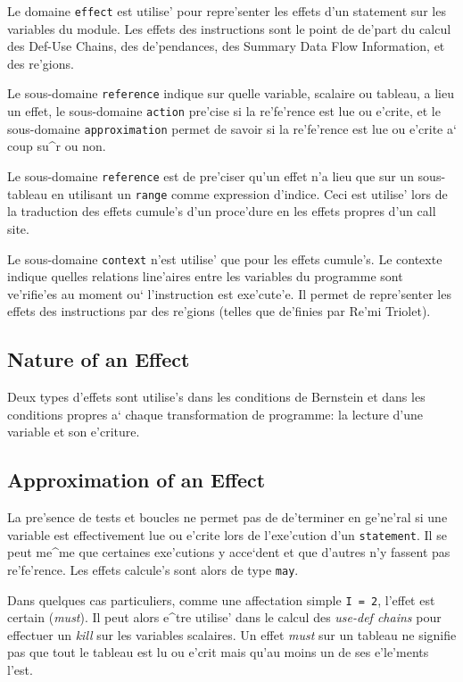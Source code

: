 {
Le domaine \verb/effect/ est utilise' pour repre'senter les effets d'un
statement sur les variables du module. Les effets des instructions sont
le point de de'part du calcul des Def-Use Chains, des de'pendances, des
Summary Data Flow Information, et des re'gions.

Le sous-domaine {\tt reference} indique sur quelle variable, scalaire ou
tableau, a lieu un effet, le sous-domaine {\tt action} pre'cise si la
re'fe'rence est lue ou e'crite, et le sous-domaine {\tt approximation}
permet de savoir si la re'fe'rence est lue ou e'crite a` coup su^r ou
non.

Le sous-domaine {\tt reference} est de pre'ciser qu'un effet n'a lieu
que sur un sous-tableau en utilisant un {\tt range} comme expression
d'indice. Ceci est utilise' lors de la traduction des effets cumule's
d'un proce'dure en les effets propres d'un call site.

Le sous-domaine {\tt context} n'est utilise' que pour les effets
cumule's. Le contexte indique quelles relations line'aires entre les
variables du programme sont ve'rifie'es au moment ou` l'instruction est
exe'cute'e.  Il permet de repre'senter les effets des instructions par
des re'gions (telles que de'finies par Re'mi Triolet).
}

\subsection{Nature of an Effect}
\label{subsection-action}

{
Deux types d'effets sont utilise's dans les conditions de Bernstein
et dans les conditions propres a` chaque transformation de programme:
la lecture d'une variable et son e'criture.
}

\subsection{Approximation of an Effect}
\label{subsection-approximation}

{
La pre'sence de tests et boucles ne permet pas de de'terminer en ge'ne'ral
si une variable est effectivement lue ou e'crite lors de l'exe'cution
d'un {\tt statement}. Il se peut me^me que certaines exe'cutions
y acce`dent et que d'autres n'y fassent pas re'fe'rence. Les effets
calcule's sont alors de type {\tt may}.

Dans quelques cas particuliers, comme une affectation simple {\tt I = 2},
l'effet est certain ({\em must}). Il peut alors e^tre utilise' dans
le calcul des {\em use-def chains} pour effectuer un {\em kill} sur les
variables scalaires. Un effet {\em must} sur un tableau ne signifie pas
que tout le tableau est lu ou e'crit mais qu'au moins un de ses
e'le'ments l'est.
}

